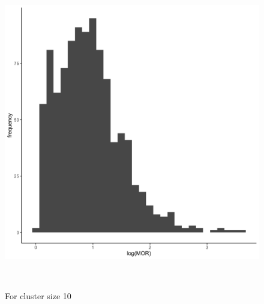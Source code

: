 \documentclass[
  letterpaper,
  DIV=11,
  numbers=noendperiod,
  titlepage]{scrartcl}
\begin{document}
\begin{figure}
\begin{minipage}[t]{0.50\linewidth}
{{\includegraphics{../../plots/two-lvl-ran-slope/low-prev/hist_10_10_two_lvl_slp_low_prev.png}

}

\caption{For cluster size 10}

}

\end{minipage}%
\newline
\begin{minipage}[t]{\linewidth}

{\centering 

~

}

\end{minipage}%
\newline
\begin{minipage}[t]{0.50\linewidth}

{\centering 

\raisebox{-\height}{

}}
\end{minipage}
\end{figure}
\end{document}
